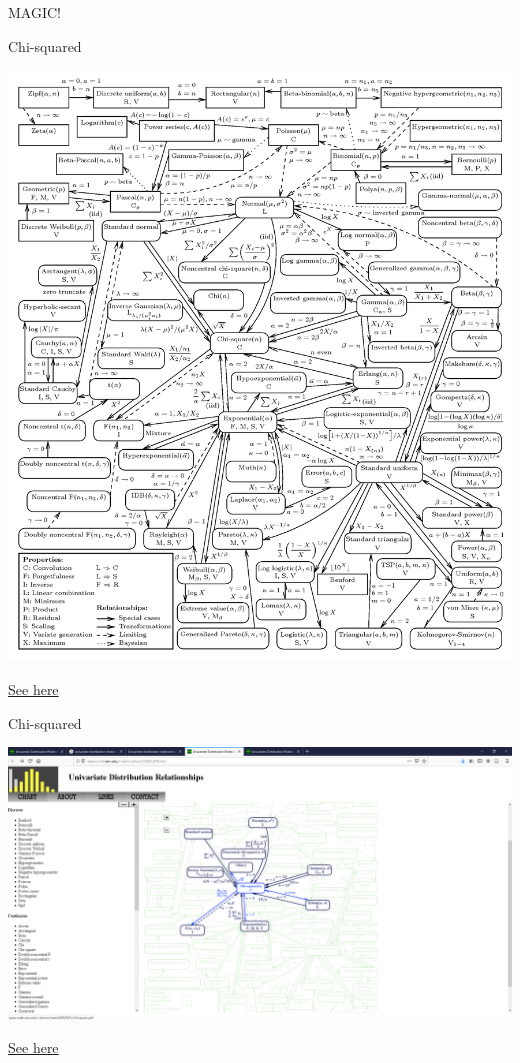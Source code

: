 \documentclass[
  ignorenonframetext,
]{beamer}
\begin{document}
\begin{frame}{MAGIC!}
\protect\hypertarget{magic}{}

\end{frame}

\begin{frame}{Chi-squared}
\protect\hypertarget{chi-squared}{}

\includegraphics{../images/distributions.png}

\href{http://www.math.wm.edu/~leemis/chart/UDR/UDR.html}{See here}

\end{frame}

\begin{frame}{Chi-squared}
\protect\hypertarget{chi-squared-1}{}

\includegraphics{../images/Chi2.PNG}

\href{http://www.math.wm.edu/~leemis/chart/UDR/UDR.html}{See here}

\end{frame}
\end{document}
